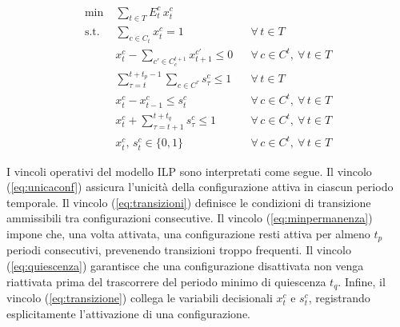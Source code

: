     \begin{subequations}\label{eq:modello}
    \begin{align}
    \min\;& \sum_{t \in T} E^c_t\, x^c_{t} \label{eq:objfun}\\
    \text{s.t.}\;& \sum_{c \in C_t} x^c_{t} = 1
        && \forall\,t \in T \label{eq:unicaconf}\\
    & x^c_{t} - \sum_{c' \in C_c^{t+1}} x^{c'}_{t+1} \le 0
        && \forall\,c \in C^t,\ \forall\,t \in T \label{eq:transizioni}\\
    & \sum_{\tau = t}^{t+t_p-1} \sum_{c \in C^{\tau}} s^c_{\tau} \le 1
        && \forall\,t \in T \label{eq:minpermanenza}\\
    & x^c_t - x^c_{t-1} \le s_t^c 
        && \forall\,c \in C^t,\ \forall\,t \in T \label{eq:transizione}\\
    & x^c_t + \sum_{\tau = t +1}^{t+t_q} s^c_{\tau} \le 1
        && \forall\,c \in C^t,\ \forall\,t \in T \label{eq:quiescenza}\\
    & x^c_t,\, s_t^c \in \{0,1\}
        && \forall\,c \in C^t,\ \forall\,t \in T \label{eq:binaria}
    \end{align}
    \end{subequations}

I vincoli operativi del modello ILP sono interpretati come segue. Il vincolo (\ref{eq:unicaconf}) assicura l’unicità della configurazione attiva in ciascun periodo temporale. Il vincolo (\ref{eq:transizioni}) definisce le condizioni di transizione ammissibili tra configurazioni consecutive. Il vincolo (\ref{eq:minpermanenza}) impone che, una volta attivata, una configurazione resti attiva per almeno $t_p$ periodi consecutivi, prevenendo transizioni troppo frequenti. Il vincolo (\ref{eq:quiescenza}) garantisce che una configurazione disattivata non venga riattivata prima del trascorrere del periodo minimo di quiescenza $t_q$. Infine, il vincolo (\ref{eq:transizione}) collega le variabili decisionali $x^c_t$ e $s^c_t$, registrando esplicitamente l’attivazione di una configurazione.